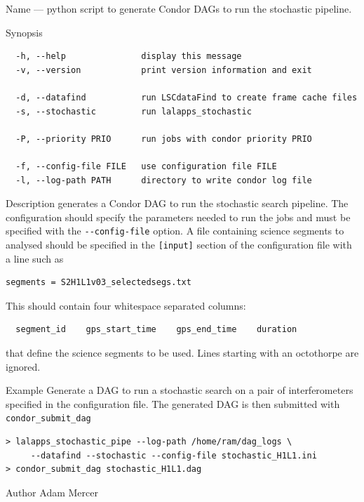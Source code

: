 \begin{entry}
\item[Name]
 --- python script to generate Condor DAGs
to run the stochastic pipeline.

\item[Synopsis]
\begin{verbatim}
  -h, --help               display this message
  -v, --version            print version information and exit

  -d, --datafind           run LSCdataFind to create frame cache files
  -s, --stochastic         run lalapps_stochastic

  -P, --priority PRIO      run jobs with condor priority PRIO

  -f, --config-file FILE   use configuration file FILE
  -l, --log-path PATH      directory to write condor log file
\end{verbatim}

\item[Description]  generates a Condor DAG
to run the stochastic search pipeline. The configuration should specify
the parameters needed to run the jobs and must be specified with the
\verb$--config-file$ option. A file containing science segments to
analysed should be specified in the \verb$[input]$ section of the
configuration file with a line such as

\begin{verbatim}
segments = S2H1L1v03_selectedsegs.txt
\end{verbatim}

This should contain four whitespace separated columns:

\begin{verbatim}
  segment_id    gps_start_time    gps_end_time    duration
\end{verbatim}

that define the science segments to be used. Lines starting with an
octothorpe are ignored.

\item[Example]
Generate a DAG to run a stochastic search on a pair of interferometers
specified in the configuration file. The generated DAG is then submitted
with \texttt{condor\_submit\_dag}

\begin{verbatim}
> lalapps_stochastic_pipe --log-path /home/ram/dag_logs \
     --datafind --stochastic --config-file stochastic_H1L1.ini
> condor_submit_dag stochastic_H1L1.dag
\end{verbatim}

\item[Author]
Adam Mercer
\end{entry}

